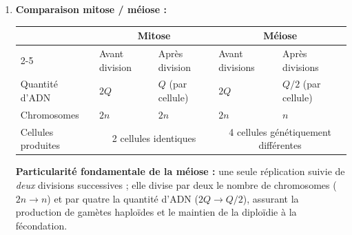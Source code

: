 \documentclass[11pt]{article}
\begin{document}
\begin{corrige}
\begin{enumerate}
\item \textbf{Comparaison mitose / méiose :}
\begin{center}
\begin{tabularx}{\linewidth}{|l|X|X|X|X|}
\hline
\rowcolor{popblueL}
 & \multicolumn{2}{c|}{\textbf{Mitose}} & \multicolumn{2}{c|}{\textbf{Méiose}} \\
\cline{2-5}
 & Avant division & Après division & Avant divisions & Après divisions \\
\hline
Quantité d'ADN & $2Q$ & $Q$ (par cellule) & $2Q$ & $Q/2$ (par cellule) \\
\hline
Chromosomes & $2n$ & $2n$ & $2n$ & $n$ \\
\hline
Cellules produites & \multicolumn{2}{c|}{2 cellules identiques} & \multicolumn{2}{c|}{4 cellules génétiquement différentes} \\
\hline
\end{tabularx}
\end{center}
\textbf{Particularité fondamentale de la méiose :} une seule réplication suivie de \emph{deux} divisions successives ; elle divise par deux le nombre de chromosomes ($2n \rightarrow n$) et par quatre la quantité d'ADN ($2Q \rightarrow Q/2$), assurant la production de gamètes haploïdes et le maintien de la diploïdie à la fécondation.
\end{enumerate}


\end{corrige}
\end{document}
